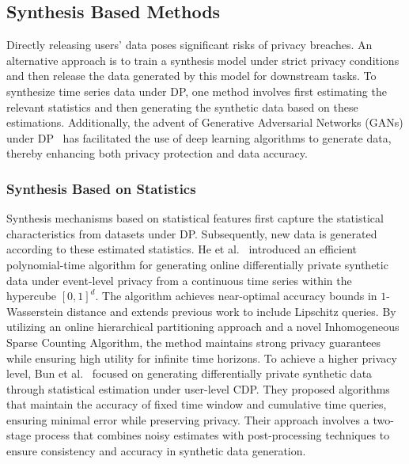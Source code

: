 \subsection{Synthesis Based Methods}
Directly releasing users' data poses significant risks of privacy breaches. An alternative approach is to train a synthesis model under strict privacy conditions and then release the data generated by this model for downstream tasks. To synthesize time series data under DP, one method involves first estimating the relevant statistics and then generating the synthetic data based on these estimations. Additionally, the advent of Generative Adversarial Networks (GANs) under DP~\cite{xie2018differentially, jordon2018pate} has facilitated the use of deep learning algorithms to generate data, thereby enhancing both privacy protection and data accuracy.

\subsubsection{Synthesis Based on Statistics}
Synthesis mechanisms based on statistical features first capture the statistical characteristics from datasets under DP. Subsequently, new data is generated according to these estimated statistics. He et al.~\cite{he2024online} introduced an efficient polynomial-time algorithm for generating online differentially private synthetic data under event-level privacy from a continuous time series within the hypercube $[0, 1]^d$. The algorithm achieves near-optimal accuracy bounds in $1$-Wasserstein distance and extends previous work to include Lipschitz queries. By utilizing an online hierarchical partitioning approach and a novel Inhomogeneous Sparse Counting Algorithm, the method maintains strong privacy guarantees while ensuring high utility for infinite time horizons. To achieve a higher privacy level, 
Bun et al.~\cite{bun2024continual} focused on generating differentially private synthetic data through statistical estimation under user-level CDP. They proposed algorithms that maintain the accuracy of fixed time window and cumulative time queries, ensuring minimal error while preserving privacy. Their approach involves a two-stage process that combines noisy estimates with post-processing techniques to ensure consistency and accuracy in synthetic data generation.



